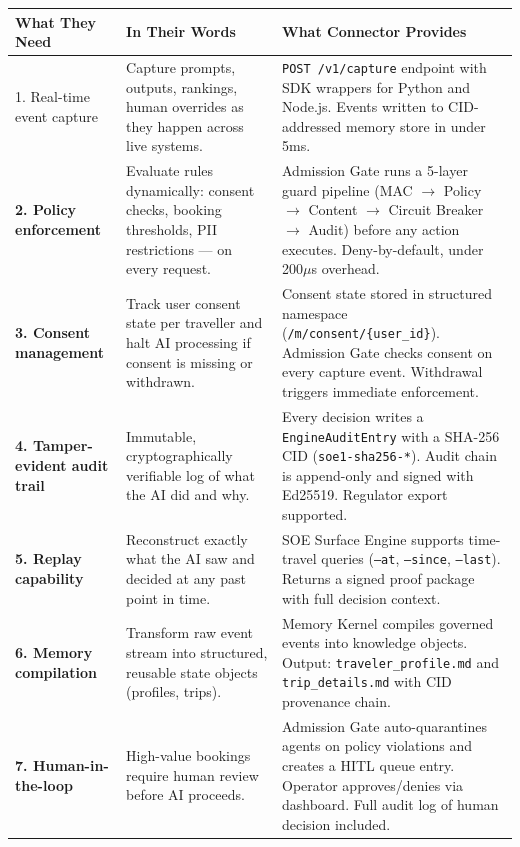 \documentclass[11pt, a4paper]{article}
\begin{document}
\begin{longtable}{>{\bfseries}p{3.8cm} p{5cm} p{5cm}}
\toprule
\textbf{What They Need} & \textbf{In Their Words} & \textbf{What Connector Provides} \\
\midrule
\endhead
\bottomrule
\endfoot

1. Real-time event capture &
Capture prompts, outputs, rankings, human overrides as they happen across live systems. &
\texttt{POST /v1/capture} endpoint with SDK wrappers for Python and Node.js. Events written to CID-addressed memory store in under 5ms. \\[6pt]

2. Policy enforcement &
Evaluate rules dynamically: consent checks, booking thresholds, PII restrictions --- on every request. &
Admission Gate runs a 5-layer guard pipeline (MAC $\to$ Policy $\to$ Content $\to$ Circuit Breaker $\to$ Audit) before any action executes. Deny-by-default, under 200$\mu$s overhead. \\[6pt]

3. Consent management &
Track user consent state per traveller and halt AI processing if consent is missing or withdrawn. &
Consent state stored in structured namespace (\texttt{/m/consent/\{user\_id\}}). Admission Gate checks consent on every capture event. Withdrawal triggers immediate enforcement. \\[6pt]

4. Tamper-evident audit trail &
Immutable, cryptographically verifiable log of what the AI did and why. &
Every decision writes a \texttt{EngineAuditEntry} with a SHA-256 CID (\texttt{soe1-sha256-*}). Audit chain is append-only and signed with Ed25519. Regulator export supported. \\[6pt]

5. Replay capability &
Reconstruct exactly what the AI saw and decided at any past point in time. &
SOE Surface Engine supports time-travel queries (\texttt{--at}, \texttt{--since}, \texttt{--last}). Returns a signed proof package with full decision context. \\[6pt]

6. Memory compilation &
Transform raw event stream into structured, reusable state objects (profiles, trips). &
Memory Kernel compiles governed events into knowledge objects. Output: \texttt{traveler\_profile.md} and \texttt{trip\_details.md} with CID provenance chain. \\[6pt]

7. Human-in-the-loop &
High-value bookings require human review before AI proceeds. &
Admission Gate auto-quarantines agents on policy violations and creates a HITL queue entry. Operator approves/denies via dashboard. Full audit log of human decision included. \\[6pt]


\end{longtable}
\end{document}
